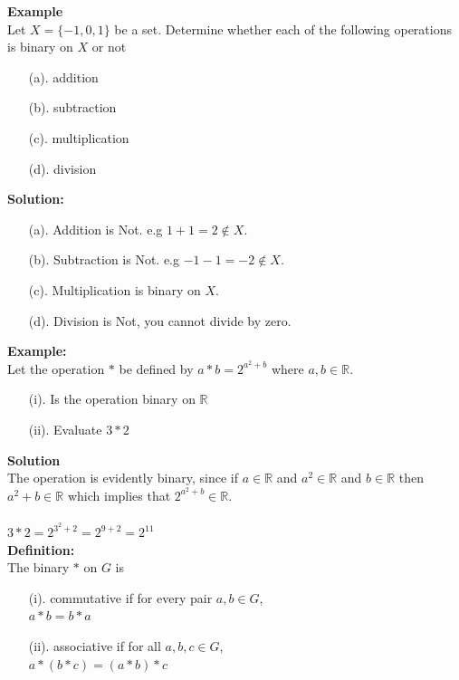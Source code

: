 \documentclass[11pt,a4paper]{article}
\begin{document}
\textbf{Example}\\ Let $X=\{-1,0,1\}$ be a set. Determine whether each of the following operations is binary on $X$ or not
\begin{enumerate}
\item[(a).] addition
\item[(b).] subtraction
\item[(c).] multiplication
\item[(d).] division\\
\end{enumerate}

\textbf{Solution:}
\begin{enumerate}
\item[(a).] Addition is Not. e.g $1+1=2\not\in X.$
\item[(b).] Subtraction is Not. e.g $-1-1=-2\not \in X$.
\item[(c).] Multiplication is binary on $X$.
\item[(d).] Division is Not, you cannot divide by zero.\\
\end{enumerate}





\pagebreak
\textbf{Example:}\\ Let the operation $*$ be defined by $a*b=2^{a^2+b}$ where $a,b \in \mathbb{R}$.
\begin{enumerate}
\item[(i).] Is the operation binary on $\mathbb{R}$
\item[(ii).] Evaluate $3*2$\\
\end{enumerate}


\textbf{Solution}\\ The operation is evidently binary, since if $a\in \mathbb{R}$ and $a^2\in \mathbb{R}$ and $b\in \mathbb{R}$ then $a^2+b\in \mathbb{R}$ which implies that $2^{a^2+b}\in \mathbb{R}.$\\\\ $3*2=2^{3^2+2}=2^{9+2}=2^{11}$\\



\textbf{Definition:}\\ The binary $*$ on $G$ is
\begin{enumerate}
\item[(i).] commutative if for every pair $a,b\in G$, \\ $a*b=b*a$
\item[(ii).] associative if for all $a,b,c\in G$,\\ $a*(b*c)=(a*b)*c$\\
\end{enumerate}
\end{document}

